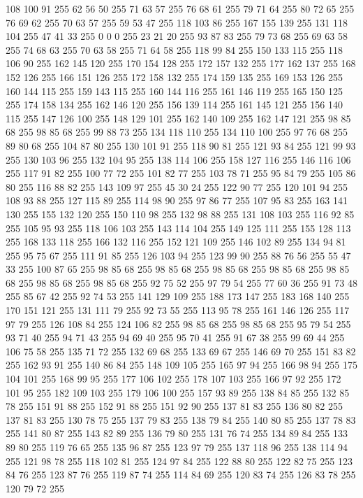 108 100 91 255 62 56 50 255 71 63 57 255 76 68 61 255 79 71 64 255 80 72 65 255 76 69 62 255 70 63 57 255 59 53 47 255 118 103 86 255 167 155 139 255 131 118 104 255 47 41 33 255 0 0 0 255 23 21 20 255 93 87 83 255 79 73 68 255 69 63 58 255 74 68 63 255 70 63 58 255 71 64 58 255 118 99 84 255 150 133 115 255 118 106 90 255 162 145 120 255 170 154 128 255 172 157 132 255 177 162 137 255 168 152 126 255 166 151 126 255 172 158 132 255 174 159 135 255 169 153 126 255 160 144 115 255 159 143 115 255 160 144 116 255 161 146 119 255 165 150 125 255 174 158 134 255 162 146 120 255 156 139 114 255 161 145 121 255 156 140 115 255 147 126 100 255 148 129 101 255 162 140 109 255 162 147 121 255 98 85 68 255 98 85 68 255 99 88 73 255 134 118 110 255 134 110 100 255 97 76 68 255 89 80 68 255 104 87 80 255 130 101 91 255 118 90 81 255 121 93 84 255 121 99 93 255 130 103 96 255 132 104 95 255 138 114 106 255 158 127 116 255 146 116 106 255
117 91 82 255 100 77 72 255 101 82 77 255 103 78 71 255 95 84 79 255 105 86 80 255 116 88 82 255 143 109 97 255 45 30 24 255 122 90 77 255 120 101 94 255 108 93 88 255 127 115 89 255 114 98 90 255 97 86 77 255 107 95 83 255 163 141 130 255 155 132 120 255 150 110 98 255 132 98 88 255 131 108 103 255 116 92 85 255 105 95 93 255 118 106 103 255 143 114 104 255 149 125 111 255 155 128 113 255 168 133 118 255 166 132 116 255 152 121 109 255 146 102 89 255 134 94 81 255 95 75 67 255 111 91 85 255 126 103 94 255 123 99 90 255 88 76 56 255 55 47 33 255 100 87 65 255 98 85 68 255 98 85 68 255 98 85 68 255 98 85 68 255 98 85 68 255 98 85 68 255 98 85 68 255 92 75 52 255 97 79 54 255 77 60 36 255 91 73 48 255 85 67 42 255 92 74 53 255 141 129 109 255 188 173 147 255 183 168 140 255 170 151 121 255 131 111 79 255 92 73 55 255 113 95 78 255 161 146 126 255 117 97 79 255 126 108 84 255 124 106 82 255 98 85 68 255
98 85 68 255 95 79 54 255 93 71 40 255 94 71 43 255 94 69 40 255 95 70 41 255 91 67 38 255 99 69 44 255 106 75 58 255 135 71 72 255 132 69 68 255 133 69 67 255 146 69 70 255 151 83 82 255 162 93 91 255 140 86 84 255 148 109 105 255 165 97 94 255 166 98 94 255 175 104 101 255 168 99 95 255 177 106 102 255 178 107 103 255 166 97 92 255 172 101 95 255 182 109 103 255 179 106 100 255 157 93 89 255 138 84 85 255 132 85 78 255 151 91 88 255 152 91 88 255 151 92 90 255 137 81 83 255 136 80 82 255 137 81 83 255 130 78 75 255 137 79 83 255 138 79 84 255 140 80 85 255 137 78 83 255 141 80 87 255 143 82 89 255 136 79 80 255 131 76 74 255 134 89 84 255 133 89 80 255 119 76 65 255 135 96 87 255 123 97 79 255 137 118 96 255 138 114 94 255 121 98 78 255 118 102 81 255 124 97 84 255 122 88 80 255 122 82 75 255 123 84 76 255 123 87 76 255 119 87 74 255 114 84 69 255 120 83 74 255 126 83 78 255 120 79 72 255
